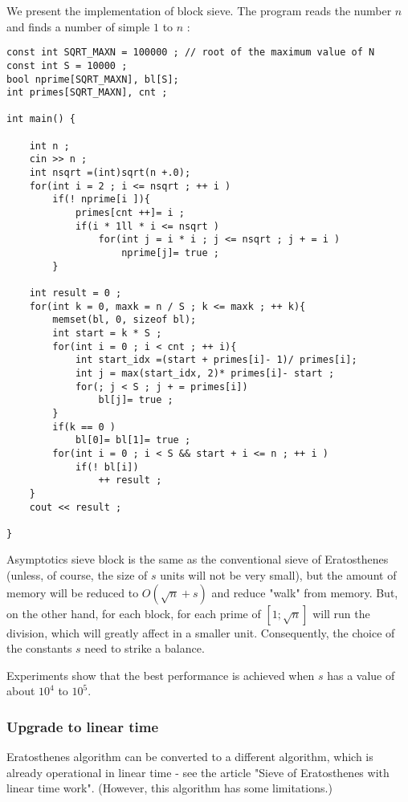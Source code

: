 We present the implementation of block sieve. The program reads the number $n$ and finds a number of simple $1$ to $n$ :

\begin{verbatim}
const int SQRT_MAXN = 100000 ; // root of the maximum value of N
const int S = 10000 ;
bool nprime[SQRT_MAXN], bl[S];
int primes[SQRT_MAXN], cnt ;
 
int main() {
 
    int n ;
    cin >> n ;
    int nsqrt =(int)sqrt(n +.0);
    for(int i = 2 ; i <= nsqrt ; ++ i )
        if(! nprime[i ]){
            primes[cnt ++]= i ;
            if(i * 1ll * i <= nsqrt )
                for(int j = i * i ; j <= nsqrt ; j + = i )
                    nprime[j]= true ;
        }
 
    int result = 0 ;
    for(int k = 0, maxk = n / S ; k <= maxk ; ++ k){
        memset(bl, 0, sizeof bl);
        int start = k * S ;
        for(int i = 0 ; i < cnt ; ++ i){
            int start_idx =(start + primes[i]- 1)/ primes[i];
            int j = max(start_idx, 2)* primes[i]- start ;
            for(; j < S ; j + = primes[i])
                bl[j]= true ;
        }
        if(k == 0 )
            bl[0]= bl[1]= true ;
        for(int i = 0 ; i < S && start + i <= n ; ++ i )
            if(! bl[i])
                ++ result ;
    }
    cout << result ;
 
}
\end{verbatim}

Asymptotics sieve block is the same as the conventional sieve of Eratosthenes (unless, of course, the size of $s$ units will not be very small), but the amount of memory will be reduced to $O (\sqrt {n} + s)$ and reduce "walk" from memory. But, on the other hand, for each block, for each prime of $[1; \sqrt {n}]$ will run the division, which will greatly affect in a smaller unit. Consequently, the choice of the constants $s$ need to strike a balance.

Experiments show that the best performance is achieved when $s$ has a value of about $10 ^ 4$ to $10 ^ 5$.

\subsubsection{ Upgrade to linear time }

Eratosthenes algorithm can be converted to a different algorithm, which is already operational in linear time - see the article "Sieve of Eratosthenes with linear time work". (However, this algorithm has some limitations.)

